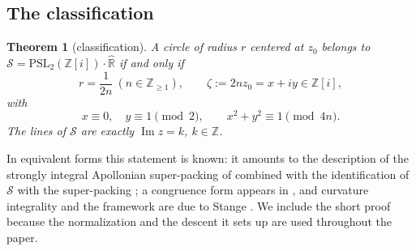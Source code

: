 \documentclass[11pt]{amsart}
\numberwithin{equation}{section}
\theoremstyle{plain}
\newtheorem{theorem}{Theorem}[section]
\theoremstyle{definition}
\theoremstyle{remark}
\newcommand{\R}{\mathbb{R}}
\newcommand{\Z}{\mathbb{Z}}
\newcommand{\Zi}{\Z[i]}
\newcommand{\Rhat}{\widehat{\R}}
\newcommand{\PSL}{\mathrm{PSL}}
\newcommand{\im}{\operatorname{Im}}
\newcommand{\Sarr}{\mathcal{S}}
\begin{document}
\subsection{The classification}

\begin{theorem}[classification]\label{thm:classification}
A circle of radius $r$ centered at $z_0$ belongs to
$\Sarr = \PSL_2(\Zi)\cdot\Rhat$ if and only if
\[
  r = \frac{1}{2n} \ (n \in \Z_{\ge 1}), \qquad
  \zeta := 2n z_0 = x + iy \in \Zi,
\]
with
\[
  x \equiv 0, \quad y \equiv 1 \pmod 2, \qquad
  x^2 + y^2 \equiv 1 \pmod{4n} .
\]
The lines of $\Sarr$ are exactly $\im z = k$, $k \in \Z$.
\end{theorem}

In equivalent forms this statement is known: it amounts to the description
of the strongly integral Apollonian super-packing of \cite[\S6]{GLMWY2006}
combined with the identification of $\Sarr$ with the super-packing
\cite[Thm.~1.3]{StangeTAMS}; a congruence form appears in
\cite{RickardsStange2026}, and curvature integrality and the framework are
due to Stange \cite{StangeIMRN}.  We include the short proof because the
normalization and the descent it sets up are used throughout the paper.
\end{document}
